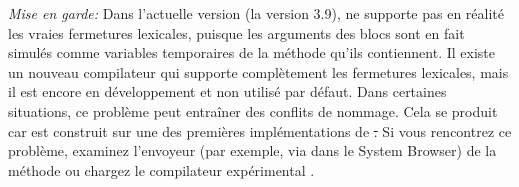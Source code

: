 \documentclass[a4paper,10pt,twoside]{book}
\begin{document}

\newpage
\emph{Mise en garde:} Dans l'actuelle version (la version 3.9), \sq ne supporte pas en r\'{e}alit\'{e} les vraies fermetures lexicales, puisque les arguments des blocs sont en fait simul\'{e}s comme variables temporaires de la m\'{e}thode qu'ils contiennent. Il existe un nouveau compilateur qui supporte compl\`{e}tement les fermetures lexicales, mais il est encore en d\'{e}veloppement et non utilis\'{e} par d\'{e}faut.
Dans certaines situations, ce probl\`{e}me peut entraîner des conflits de nommage. Cela se produit car \sq est construit sur une des premi\`{e}res impl\'{e}mentations de \st.
Si vous rencontrez ce probl\`{e}me, examinez l'envoyeur 
(par exemple, via  dans le System Browser)
de la m\'{e}thode  ou chargez le
compilateur 
expérimental .






\end{document}
